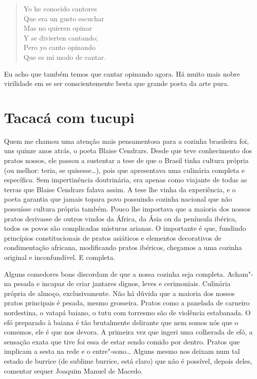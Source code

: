 \begin{verse}
Yo he conocido cantores\\
Que era un gusto escuchar\\
Mas no quieren opinar\\
Y se divierten cantando;\\
Pero yo canto opinando\\
Que es mi modo de cantar.
\end{verse}

Eu acho que também temos que cantar opinando agora. Há muito mais nobre
virilidade em se ser conscientemente besta que grande poeta da arte
pura.

\chapter{Tacacá com tucupi}

Quem me chamou uma atenção mais pensamentosa para a cozinha brasileira
foi, uns quinze anos atrás, o poeta Blaise Cendrars. Desde que teve
conhecimento dos pratos nossos, ele passou a sustentar a tese de que o
Brasil tinha cultura própria (ou melhor: teria, se quisesse\ldots{}), pois
que apresentava uma culinária completa e específica. Sem impertinência
doutrinária, era apenas como viajante de todas as terras que Blaise
Cendrars falava assim. A tese lhe vinha da experiência, e o poeta
garantia que jamais topara povo possuindo cozinha nacional que não
possuísse cultura própria também. Pouco lhe importava que a maioria dos
nossos pratos derivasse de outros vindos da África, da Ásia ou da
península ibérica, todos os povos são complicadas misturas arianas. O
importante é que, fundindo princípios constitucionais de pratos
asiáticos e elementos decorativos de condimentação africana, modificando
pratos ibéricos, chegamos a uma cozinha original e inconfundível. E
completa.

Alguns comedores bons discordam de que a nossa cozinha seja completa.
Acham"-na pesada e incapaz de criar jantares dignos, leves e cerimoniais.
Culinária própria de almoço, exclusivamente. Não há dúvida que a maioria
dos nossos pratos principais é pesada, mesmo grosseira. Pratos como a
panelada de carneiro nordestina, o vatapá baiano, o tutu com torresmo
são de violência estabanada. O efó preparado à baiana é tão brutalmente
delirante que nem somos nós que o comemos, ele é que nos devora. A
primeira vez que ingeri uma colherada de efó, a sensação exata que tive
foi essa de estar sendo comido por dentro. Pratos que implicam a sesta
na rede e o entre"-sono\ldots{} Alguns mesmo nos deixam num tal estado de
burrice (de sublime burrice, está claro) que não é possível, depois
deles, comentar sequer Joaquim Manuel de Macedo.

